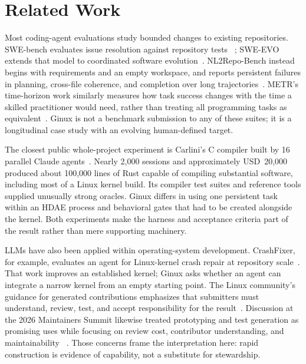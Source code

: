\documentclass[11pt]{article}
\begin{document}
\section{Related Work}

Most coding-agent evaluations study bounded changes to existing repositories.
SWE-bench evaluates issue resolution against repository tests
~\cite{jimenez2023swebench}; SWE-EVO extends that model to coordinated software
evolution~\cite{thai2025sweevo}. NL2Repo-Bench instead begins with requirements
and an empty workspace, and reports persistent failures in planning, cross-file
coherence, and completion over long trajectories~\cite{ding2026nl2repo}. METR's
time-horizon work similarly measures how task success changes with the time a
skilled practitioner would need, rather than treating all programming tasks as
equivalent~\cite{kwa2025timehorizon}. Ginux is not a benchmark submission to any
of these suites; it is a longitudinal case study with an evolving human-defined
target.

The closest public whole-project experiment is Carlini's C compiler built by 16
parallel Claude agents~\cite{carlini2026compiler}. Nearly 2,000 sessions and
approximately USD~20,000 produced about 100,000 lines of Rust capable of
compiling substantial software, including most of a Linux kernel build. Its
compiler test suites and reference tools supplied unusually strong oracles.
Ginux differs in using one persistent task within an HDAE process and
behavioral gates that had to be created alongside the kernel. Both experiments
make the harness and acceptance criteria part of the result rather than mere
supporting machinery.

LLMs have also been applied within operating-system development. CrashFixer,
for example, evaluates an agent for Linux-kernel crash repair at repository
scale~\cite{mathai2025crashfixer}. That work improves an established kernel;
Ginux asks whether an agent can integrate a narrow kernel from an empty starting
point. The Linux community's guidance for generated contributions emphasizes
that submitters must understand, review, test, and accept responsibility for the
result~\cite{linuxGeneratedContent}. Discussion at the 2026 Maintainers Summit
likewise treated prototyping and test generation as promising uses while
focusing on review cost, contributor understanding, and maintainability
~\cite{corbet2026summit}. Those concerns frame the interpretation here: rapid
construction is evidence of capability, not a substitute for stewardship.
\end{document}
